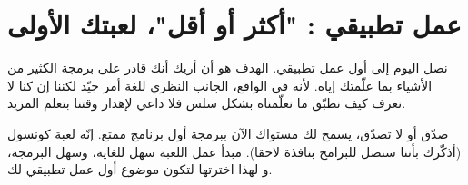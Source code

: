 \chapter{عمل تطبيقي : "أكثر أو أقل"، لعبتك الأولى}

نصل اليوم إلى أول عمل تطبيقي. الهدف هو أن أريك أنك قادر على برمجة الكثير من الأشياء بما علّمتك إياه. لأنه في الواقع، الجانب النظري للغة أمر جيّد لكننا إن كنا لا نعرف كيف نطبّق ما تعلّمناه بشكل سلس فلا داعي لإهدار وقتنا بتعلم المزيد.

صدّق أو لا تصدّق، يسمح لك مستواك الآن ببرمجة أول برنامج ممتع. إنّه لعبة كونسول (أذكّرك بأننا سنصل للبرامج بنافذة لاحقا). مبدأ عمل اللعبة سهل للغاية، وسهل البرمجة، و لهذا اخترتها لتكون موضوع أول عمل تطبيقي لك.
